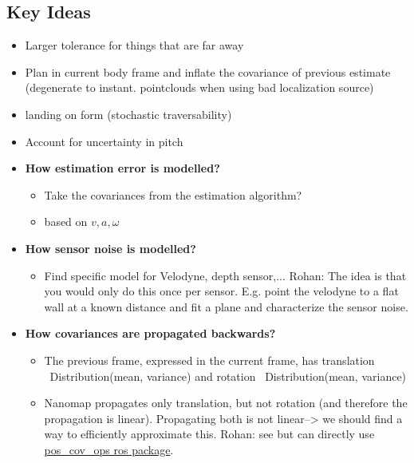 \documentclass[letterpaper, 10 pt, conference]{ieeeconf}  %
\newcommand{\rohan}[1]{{\color{blue} Rohan: #1}}
\begin{document}
\subsection{Key Ideas}
\begin{itemize}
    \item Larger tolerance for things that are far away
    \item Plan in current body frame and inflate the covariance of previous estimate (degenerate to instant. pointclouds when using bad localization source)
    \item landing on form (stochastic traversability)
    \item Account for uncertainty in pitch
    
    \item \textbf{How estimation error is modelled?}
    \begin{itemize}
		\item Take the covariances from the estimation algorithm? 
		\item based on $v, a, \omega$
	\end{itemize}

    \item \textbf{How sensor noise is modelled?}
    \begin{itemize}
		\item Find specific model for Velodyne, depth sensor,... 
		\rohan{The idea is that you would only do this once per sensor. E.g. point the velodyne to a flat wall at a known distance and fit a plane and characterize the sensor noise.}
	\end{itemize}

    \item \textbf{How covariances are propagated backwards?}
    \begin{itemize}
		\item The previous frame, expressed in the current frame, has translation ~Distribution(mean, variance) and rotation ~Distribution(mean, variance)
		\item Nanomap propagates only translation, but not rotation (and therefore the propagation is linear). Propagating both is not linear--> we should find a way to efficiently approximate this. 
		\rohan{see \cite{barfoot2014associating} \cite{se3unc} but can directly use \href{http://wiki.ros.org/pose_cov_ops}{pos\_cov\_ops ros package}}.
	\end{itemize}


\end{itemize}
\end{document}
